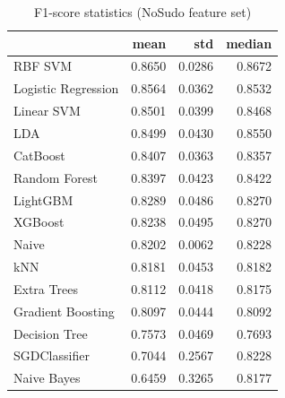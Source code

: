 \begin{table}
\caption{F1-score statistics (NoSudo feature set)}
\label{tab:f1_NoSudo_stats}
\begin{tabular}{lrrr}
\toprule
 & mean & std & median \\
\midrule
RBF SVM & 0.8650 & 0.0286 & 0.8672 \\
Logistic Regression & 0.8564 & 0.0362 & 0.8532 \\
Linear SVM & 0.8501 & 0.0399 & 0.8468 \\
LDA & 0.8499 & 0.0430 & 0.8550 \\
CatBoost & 0.8407 & 0.0363 & 0.8357 \\
Random Forest & 0.8397 & 0.0423 & 0.8422 \\
LightGBM & 0.8289 & 0.0486 & 0.8270 \\
XGBoost & 0.8238 & 0.0495 & 0.8270 \\
Naive & 0.8202 & 0.0062 & 0.8228 \\
kNN & 0.8181 & 0.0453 & 0.8182 \\
Extra Trees & 0.8112 & 0.0418 & 0.8175 \\
Gradient Boosting & 0.8097 & 0.0444 & 0.8092 \\
Decision Tree & 0.7573 & 0.0469 & 0.7693 \\
SGDClassifier & 0.7044 & 0.2567 & 0.8228 \\
Naive Bayes & 0.6459 & 0.3265 & 0.8177 \\
\bottomrule
\end{tabular}
\end{table}
